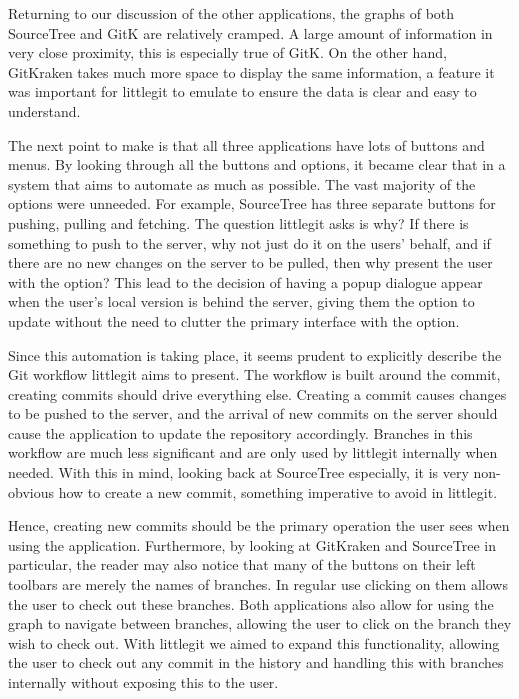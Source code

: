 
Returning to our discussion of the other applications, the graphs of both SourceTree and GitK are relatively cramped. A large amount of information in very close proximity, this is especially true of GitK. On the other hand, GitKraken takes much more space to display the same information, a feature it was important for littlegit to emulate to ensure the data is clear and easy to understand.

The next point to make is that all three applications have lots of buttons and menus. By looking through all the buttons and options, it became clear that in a system that aims to automate as much as possible. The vast majority of the options were unneeded. For example, SourceTree has three separate buttons for pushing, pulling and fetching. The question littlegit asks is why? If there is something to push to the server, why not just do it on the users' behalf, and if there are no new changes on the server to be pulled, then why present the user with the option? This lead to the decision of having a popup dialogue appear when the user's local version is behind the server, giving them the option to update without the need to clutter the primary interface with the option.

Since this automation is taking place, it seems prudent to explicitly describe the Git workflow littlegit aims to present. The workflow is built around the commit, creating commits should drive everything else. Creating a commit causes changes to be pushed to the server, and the arrival of new commits on the server should cause the application to update the repository accordingly. Branches in this workflow are much less significant and are only used by littlegit internally when needed. With this in mind, looking back at SourceTree especially, it is very non-obvious how to create a new commit, something imperative to avoid in littlegit. 

Hence, creating new commits should be the primary operation the user sees when using the application. Furthermore, by looking at GitKraken and SourceTree in particular, the reader may also notice that many of the buttons on their left toolbars are merely the names of branches. In regular use clicking on them allows the user to check out these branches. Both applications also allow for using the graph to navigate between branches, allowing the user to click on the branch they wish to check out. With littlegit we aimed to expand this functionality, allowing the user to check out any commit in the history and handling this with branches internally without exposing this to the user.

